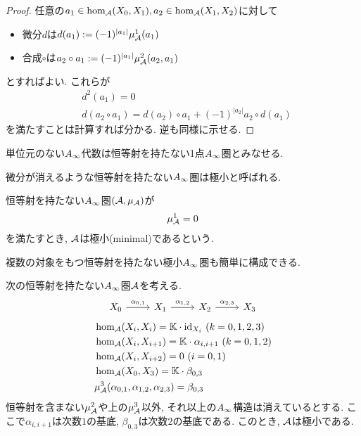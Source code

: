 \documentclass[uplatex, a4paper, 14Q, dvipdfmx]{jsarticle}
\begin{document}
\begin{proof}
  任意の$a_1 \in \hom_{\mathcal{A}}(X_0,X_1), a_2 \in \hom_{\mathcal{A}}(X_1,X_2)$に対して
  \begin{itemize}
    \item 微分$d$は$d(a_1) := (-1)^{|a_1|} \mu^1_{\mathcal{A}}(a_1)$
    \item 合成$\circ$は$a_2 \circ a_1 := (-1)^{|a_1|} \mu^2_{\mathcal{A}}(a_2,a_1)$
  \end{itemize}
  とすればよい. 
  これらが
  \begin{align*}
    &d^2(a_1)=0 \\
    &d(a_2 \circ a_1)=d(a_2) \circ a_1 + (-1)^{|a_2|} a_2 \circ d(a_1)
  \end{align*}
  を満たすことは計算すれば分かる. 
  逆も同様に示せる. 
\end{proof}

\begin{example}
  単位元のない$A_{\infty}$代数は恒等射を持たない1点$A_{\infty}$圏とみなせる. 
\end{example}

微分が消えるような恒等射を持たない$A_{\infty}$圏は極小と呼ばれる.

\begin{definition}
  恒等射を持たない$A_{\infty}$圏$(\mathcal{A},\mu_{\mathcal{A}})$が
  \begin{align*}
    \mu^1_{\mathcal{A}} = 0
  \end{align*}
  を満たすとき, $\mathcal{A}$は極小(minimal)であるという. 
\end{definition}

複数の対象をもつ恒等射を持たない極小$A_{\infty}$圏も簡単に構成できる.

\begin{example}
  次の恒等射を持たない$A_{\infty}$圏$\mathcal{A}$を考える. 
  \[\begin{tikzcd}
    {X_0} & {X_1} & {X_2} & {X_3}
    \arrow["{\alpha_{0,1}}", from=1-1, to=1-2]
    \arrow["{\alpha_{1,2}}", from=1-2, to=1-3]
    \arrow["{\alpha_{2,3}}", from=1-3, to=1-4]
  \end{tikzcd}\]
  \begin{align*}
    &\hom_{\mathcal{A}}(X_i,X_i) = \mathbb{K} \cdot \mathrm{id}_{X_i} ~ (k=0,1,2,3) \\
    &\hom_{\mathcal{A}}(X_i,X_{i+1}) = \mathbb{K} \cdot \alpha_{i,i+1} ~ (k=0,1,2) \\
    &\hom_{\mathcal{A}}(X_i,X_{i+2}) = 0 ~ (i=0,1) \\
    &\hom_{\mathcal{A}}(X_0,X_3) = \mathbb{K} \cdot \beta_{0,3} \\
    &\mu_{\mathcal{A}}^3(\alpha_{0,1},\alpha_{1,2},\alpha_{2,3}) = \beta_{0,3}
  \end{align*}
  恒等射を含まない$\mu^2_{\mathcal{A}}$や上の$\mu_{\mathcal{A}}^3$以外, それ以上の$A_{\infty}$構造は消えているとする. 
  ここで$\alpha_{i,i+1}$は次数$1$の基底, $\beta_{0,3}$は次数$2$の基底である. 
  このとき, $\mathcal{A}$は極小である. 
\end{example}
\end{document}
